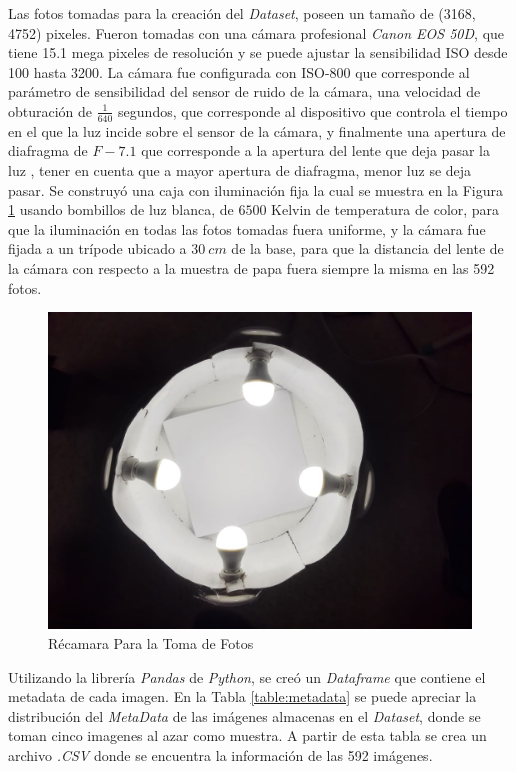 	Las fotos tomadas para la creación del \textit{Dataset}, poseen un tamaño de (3168, 4752) pixeles. Fueron tomadas con una cámara profesional \textit{Canon EOS 50D}, que tiene 15.1 mega pixeles de resolución y se puede ajustar la sensibilidad ISO desde 100 hasta 3200. La cámara fue configurada con ISO-800 que corresponde al parámetro de sensibilidad del sensor de ruido de la cámara, una velocidad de obturación de $\frac{1}{640}$ segundos, que corresponde al dispositivo que controla el tiempo en el que la luz incide sobre el sensor de la cámara, y finalmente una apertura de diafragma de $F-7.1$ que corresponde a la apertura del lente que deja pasar la luz \cite{Camara}, tener en cuenta que a mayor apertura de diafragma, menor luz se deja pasar. Se construyó una caja con iluminación fija la cual se muestra en la Figura \ref{fig:chamber} usando bombillos de luz blanca, de $6500$ Kelvin de temperatura de color, para que la iluminación en todas las fotos tomadas fuera uniforme, y la cámara fue fijada a un trípode ubicado a $30 \ cm$ de la base, para que la distancia del lente de la cámara con respecto a la muestra de papa fuera siempre la misma en las 592 fotos.

	\begin{figure}[ht]
		\centering
		\includegraphics[scale=0.15]{Figs/Chamber.JPEG}
		\caption{Récamara Para la Toma de Fotos}
		\label{fig:chamber}
	\end{figure}
	
	Utilizando la librería \textit{Pandas} de \textit{Python}, se creó un \textit{Dataframe} que contiene el metadata de cada imagen. En la Tabla \ref{table:metadata} se puede apreciar la distribución del \textit{MetaData} de las imágenes almacenas en el \textit{Dataset}, donde se toman cinco imagenes al azar como muestra. A partir de esta tabla se crea un archivo \textit{.CSV} donde se encuentra la información de las 592 imágenes.
	
